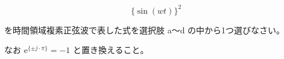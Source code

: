 \[
\{\sin (wt) \}^2
\]

\bigskip
\noindent を時間領域複素正弦波で表した式を選択肢 a〜d の中から1つ選びなさい。

\noindent なお $\textrm{e}^{\{ \pm j \cdot \pi \}} = -1$ と置き換えること。
